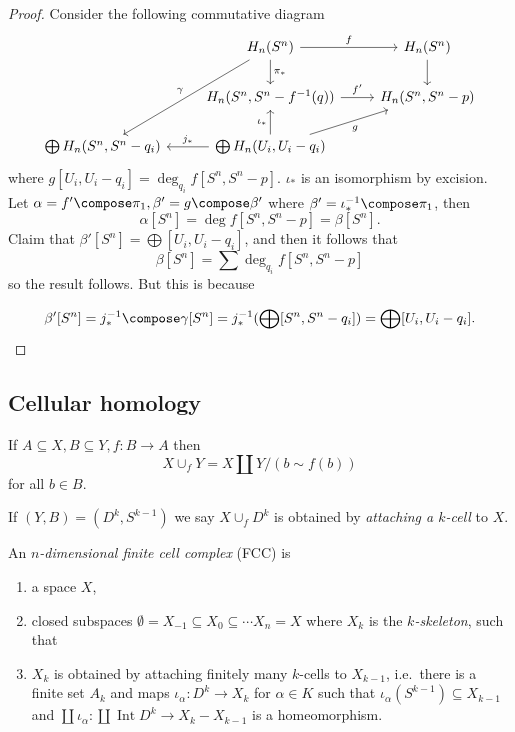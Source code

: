 \documentclass[a4paper]{article}
\DeclareMathOperator{\Int}{Int} %
\begin{document}
\begin{proof}
  Consider the following commutative diagram
  \[
    \begin{tikzcd}
      & H_n(S^n) \ar[r, "f"] \ar[d, "\pi_*"] \ar[ddl, "\gamma"'] & H_n(S^n) \ar[d] \\
      &H_n(S^n, S^n - f^{-1}(q)) \ar[r, "f'"] & H_n(S^n, S^n - p) \\
      \bigoplus H_n(S^n, S^n - q_i) & \bigoplus H_n(U_i, U_i - q_i) \ar[u, "\iota_*"] \ar[ur, "g"'] \ar[l, "j_*"']
    \end{tikzcd}
  \]
  where \(g [U_i, U_i - q_i] = \deg_{q_i} f[S^n, S^n - p]\). \(\iota_*\) is an isomorphism by excision. Let \(\alpha = f' \compose \pi_1, \beta' = g \compose \beta'\) where \(\beta' = \iota_*^{-1} \compose \pi_1\), then
  \[
    \alpha[S^n] = \deg f [S^n, S^n - p] = \beta[S^n].
  \]
  Claim that \(\beta'[S^n]  = \bigoplus [U_i, U_i - q_i]\), and then it follows that
  \[
    \beta[S^n] = \sum \deg_{q_i} f [S^n, S^n - p]
  \]
  so the result follows. But this is because

    \[
      \beta'[S^n] = j_*^{-1} \compose \gamma [S^n] = j_*^{-1}(\bigoplus [S^n, S^n - q_i]) = \bigoplus [U_i, U_i - q_i].
    \]
\end{proof}

\subsection{Cellular homology}

\begin{definition}
  If \(A \subseteq X, B \subseteq Y, f: B \to A\) then
  \[
    X \cup_f Y = X \amalg Y/(b \sim f(b))
  \]
  for all \(b \in B\).

  If \((Y, B) = (D^k, S^{k - 1})\) we say \(X \cup_f D^k\) is obtained by \emph{attaching a \(k\)-cell} to \(X\).
\end{definition}

\begin{definition}
  An \emph{\(n\)-dimensional finite cell complex} (FCC) is
  \begin{enumerate}
  \item a space \(X\),
  \item closed subspaces \(\emptyset = X_{-1} \subseteq X_0 \subseteq \cdots X_n = X\) where \(X_k\) is the \emph{\(k\)-skeleton}, such that
  \item \(X_k\) is obtained by attaching finitely many \(k\)-cells to \(X_{k - 1}\), i.e.\ there is a finite set \(A_k\) and maps \(\iota_\alpha: D^k \to X_k\) for \(\alpha \in K\) such that \(\iota_\alpha(S^{k - 1}) \subseteq X_{k - 1}\) and \(\coprod \iota_\alpha: \coprod \Int D^k \to X_k - X_{k - 1}\) is a homeomorphism.
  \end{enumerate}
\end{definition}
\end{document}
